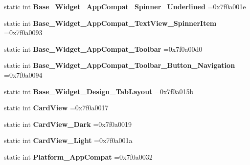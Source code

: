 \begin{DoxyCompactItemize}
static int {\bfseries Base\+\_\+\+Widget\+\_\+\+App\+Compat\+\_\+\+Spinner\+\_\+\+Underlined} =0x7f0a001e
\item 
\mbox{\label{classandroid_1_1support_1_1design_1_1R_1_1style_a79cb3062ad882193c126b541d0c90cd0}} 
static int {\bfseries Base\+\_\+\+Widget\+\_\+\+App\+Compat\+\_\+\+Text\+View\+\_\+\+Spinner\+Item} =0x7f0a0093
\item 
\mbox{\label{classandroid_1_1support_1_1design_1_1R_1_1style_abc85ca43b0087aaedba6e640c5881976}} 
static int {\bfseries Base\+\_\+\+Widget\+\_\+\+App\+Compat\+\_\+\+Toolbar} =0x7f0a00d0
\item 
\mbox{\label{classandroid_1_1support_1_1design_1_1R_1_1style_adb8d1b3dd3f212073b05b76b48aabcd5}} 
static int {\bfseries Base\+\_\+\+Widget\+\_\+\+App\+Compat\+\_\+\+Toolbar\+\_\+\+Button\+\_\+\+Navigation} =0x7f0a0094
\item 
\mbox{\label{classandroid_1_1support_1_1design_1_1R_1_1style_afa2f4b1fe1889ef368c7eb783acd65bb}} 
static int {\bfseries Base\+\_\+\+Widget\+\_\+\+Design\+\_\+\+Tab\+Layout} =0x7f0a015b
\item 
\mbox{\label{classandroid_1_1support_1_1design_1_1R_1_1style_aa1d1e67b4f4214699f752d0f5b0ce03e}} 
static int {\bfseries Card\+View} =0x7f0a0017
\item 
\mbox{\label{classandroid_1_1support_1_1design_1_1R_1_1style_a02fa630bba3d281a9ad75b5b2500ed43}} 
static int {\bfseries Card\+View\+\_\+\+Dark} =0x7f0a0019
\item 
\mbox{\label{classandroid_1_1support_1_1design_1_1R_1_1style_a913dc4accdbdf91a74eca0034b43aa69}} 
static int {\bfseries Card\+View\+\_\+\+Light} =0x7f0a001a
\item 
\mbox{\label{classandroid_1_1support_1_1design_1_1R_1_1style_a59527c05d38dfa152bef6f6425edf8c0}} 
static int {\bfseries Platform\+\_\+\+App\+Compat} =0x7f0a0032

\end{DoxyCompactItemize}
